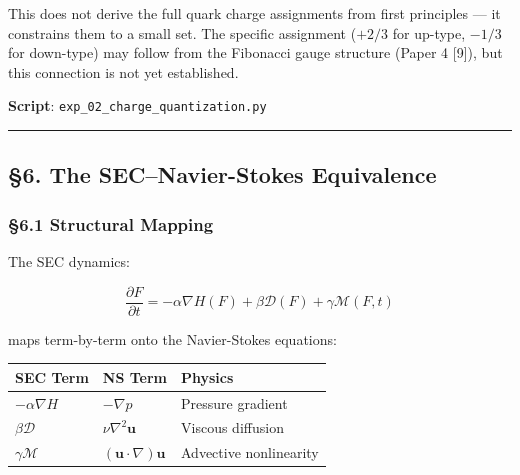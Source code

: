\documentclass[
  11pt,
  a4paper]{article}
\begin{document}
This does not derive the full quark charge assignments from first
principles --- it constrains them to a small set. The specific
assignment (\(+2/3\) for up-type, \(-1/3\) for down-type) may follow
from the Fibonacci gauge structure (Paper 4 {[}9{]}), but this
connection is not yet established.

\textbf{Script}: \texttt{exp\_02\_charge\_quantization.py}

\begin{center}\rule{0.5\linewidth}{0.5pt}\end{center}

\subsection{§6. The SEC--Navier-Stokes
Equivalence}\label{the-secnavier-stokes-equivalence}

\subsubsection{§6.1 Structural Mapping}\label{structural-mapping}

The SEC dynamics:

\[\frac{\partial F}{\partial t} = -\alpha\nabla H(F) + \beta\mathcal{D}(F) + \gamma\mathcal{M}(F, t)\]

maps term-by-term onto the Navier-Stokes equations:

\begin{longtable}[]{@{}
  >{\raggedright\arraybackslash}p{}
  >{\raggedright\arraybackslash}p{}
  >{\raggedright\arraybackslash}p{}@{}}
\toprule\noalign{}
\begin{minipage}[b]{\linewidth}\raggedright
SEC Term
\end{minipage} & \begin{minipage}[b]{\linewidth}\raggedright
NS Term
\end{minipage} & \begin{minipage}[b]{\linewidth}\raggedright
Physics
\end{minipage} \\
\midrule\noalign{}
\endhead
\bottomrule\noalign{}
\endlastfoot
\(-\alpha\nabla H\) & \(-\nabla p\) & Pressure gradient \\
\(\beta\mathcal{D}\) & \(\nu\nabla^2 \mathbf{u}\) & Viscous diffusion \\
\(\gamma\mathcal{M}\) & \((\mathbf{u} \cdot \nabla)\mathbf{u}\) &
Advective nonlinearity \\
\end{longtable}
\end{document}
